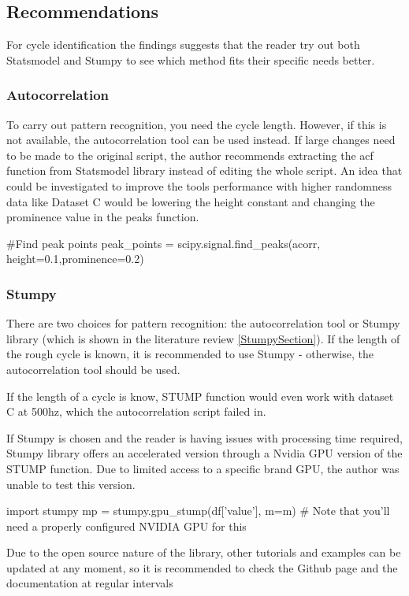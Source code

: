 \subsection{Recommendations}
For cycle identification the findings suggests that the reader try out both Statsmodel and Stumpy to see which method fits their specific needs better. 
\subsubsection{Autocorrelation}
To carry out pattern recognition, you need the cycle length. However, if this is not available, the autocorrelation tool can be used instead.  If large changes need to be made to the original script, the author recommends extracting the acf function from Statsmodel library instead of editing the whole script. 
An idea that could be investigated to improve the tools performance with higher randomness data like Dataset C would be lowering the height constant and changing the prominence value in the peaks function. 

\begin{python}
#Find peak points
peak_points = scipy.signal.find_peaks(acorr, height=0.1,prominence=0.2)
\end{python}

\subsubsection{Stumpy}
There are two choices for pattern recognition: the autocorrelation tool or Stumpy library (which is shown in the literature review \ref{StumpySection}). If the length of the rough cycle is known, it is recommended to use Stumpy - otherwise, the autocorrelation tool should be used. 

If the length of a cycle is know, STUMP function would even work with dataset C at 500hz, which the autocorrelation script failed in.

If Stumpy is chosen and the reader is having issues with processing time required, Stumpy library offers an accelerated version through a Nvidia GPU version of the STUMP function. Due to limited access to a specific brand GPU, the author was unable to test this version. 
\begin{python}
import stumpy
mp = stumpy.gpu_stump(df['value'], m=m)  
# Note that you'll need a properly configured NVIDIA GPU for this
\end{python}

Due to the open source nature of the library, other tutorials and examples can be updated at any moment, so it is recommended to check the Github page and the documentation at regular intervals  \cite{law2019stumpy}

